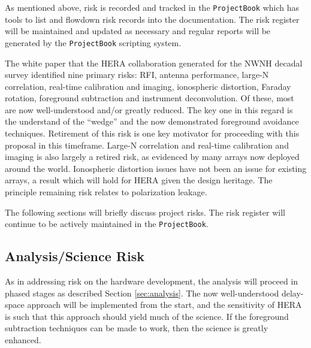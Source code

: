 \documentclass[preprint]{aastex}
\begin{document}
As mentioned above, risk is recorded and tracked in the {\tt ProjectBook} which has tools 
to list and flowdown risk records into the documentation.  The risk register will be 
maintained and updated as necessary and regular reports will be generated by the
{\tt ProjectBook} scripting system.

The white paper that the HERA collaboration generated for the NWNH decadal survey identified nine
primary risks:  RFI, antenna performance, large-N correlation, real-time calibration and imaging, 
ionospheric distortion, Faraday rotation, foreground subtraction and instrument deconvolution.
Of these, most are now well-understood and/or greatly reduced.  The key one in this regard is
the understand of the ``wedge'' and the now demonstrated foreground avoidance techniques.
Retirement of this risk is one key motivator for proceeding with this proposal in this
timeframe.  Large-N correlation and real-time calibration and imaging is also largely a
retired risk, as evidenced by many arrays now deployed around the world.  Ionospheric
distortion issues have not been an issue for existing arrays, a result which will hold for
HERA given the design heritage.  The principle remaining risk relates to polarization leakage.

The following sections will briefly discuss project risks.  The risk register will continue to be
actively maintained in the {\tt ProjectBook}.

\subsection{Analysis/Science Risk}
As in addressing risk on the hardware development, the analysis will proceed in
phased stages as described Section \ref{sec:analysis}. The now well-understood
delay-space approach will be implemented from the start, and the sensitivity of HERA
is such that this approach should yield much of the science. If the foreground
subtraction techniques can be made to work, then the science is greatly enhanced.
\end{document}
